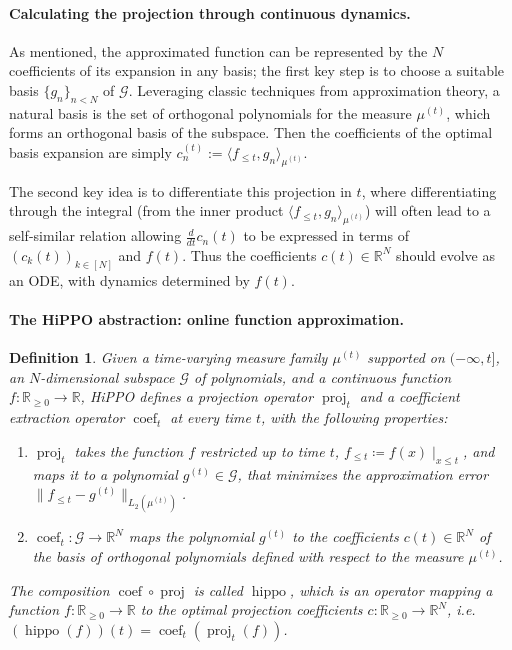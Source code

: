 \documentclass{article}
\newtheorem{definition}{Definition}
\newcommand{\R}{\mathbb{R}}
\newcommand{\defeq}{\coloneqq}
\DeclareMathOperator{\proj}{proj}
\DeclareMathOperator{\coef}{coef}
\DeclareMathOperator{\hippo}{hippo}
\begin{document}
\paragraph{Calculating the projection through continuous dynamics.}
As mentioned, the approximated function can be represented by the $N$ coefficients of its expansion in any basis;
the first key step is to choose a suitable basis $\{g_n\}_{n < N}$ of $\mathcal{G}$.
Leveraging classic techniques from approximation theory, a natural basis is the set of orthogonal polynomials for the measure $\mu^{(t)}$,
which forms an orthogonal basis of the subspace.
Then the coefficients of the optimal basis expansion are simply $c^{(t)}_n := \langle f_{\le t}, g_n \rangle_{\mu^{(t)}}$.

The second key idea is to differentiate this projection in $t$, where
differentiating through the integral (from the inner product
$\langle f_{\leq t},  g_n \rangle_{\mu^{(t)}}$) will often lead to a self-similar relation
allowing $\frac{d}{dt} c_n(t)$ to be expressed in terms of $(c_k(t))_{k\in [N]}$ and $f(t)$.
Thus the coefficients $c(t) \in \R^N$ should evolve as an ODE, with dynamics determined by $f(t)$.

\paragraph{The HiPPO abstraction: online function approximation.}
\begin{definition}\label{def:hippo}
    Given a time-varying measure family $\mu^{(t)}$ supported on $(-\infty, t]$, an
    $N$-dimensional subspace $\mathcal{G}$ of polynomials, and a continuous
    function $f \colon \mathbb{R}_{\geq 0} \to \mathbb{R}$,
    HiPPO defines a \emph{projection} operator $\proj_t$ and a \emph{coefficient extraction} operator $\coef_t$ at every time $t$, with the following properties:
    \begin{enumerate}[label=(\arabic*), topsep=0em, partopsep=0.0em, itemsep=0em, parsep=0.1em, leftmargin=2em]
      \item $\proj_t$ takes the function $f$ restricted up to time $t$,
      $f_{\leq t} \defeq f(x) \mid_{x \leq t}$, and maps it to a
      polynomial $g^{(t)} \in \mathcal{G}$, that minimizes the approximation error $\|f_{\leq t} - g^{(t)}\|_{L_2(\mu^{(t)})}$.
        \item $\coef_t: \mathcal{G} \to \mathbb{R}^N$ maps the polynomial $g^{(t)}$
        to the coefficients $c(t) \in \mathbb{R}^N$ of the basis of orthogonal
        polynomials defined with respect to the measure $\mu^{(t)}$.
    \end{enumerate}
    The composition $\coef \circ \proj$ is called $\hippo$, which is an operator
    mapping a function $f: \R_{\geq 0} \to \R$ to the optimal projection coefficients
    $c: \R_{\geq 0} \to \R^N$, i.e.\ $(\hippo(f))(t) = \coef_t(\proj_t(f))$.
\end{definition}
\end{document}
